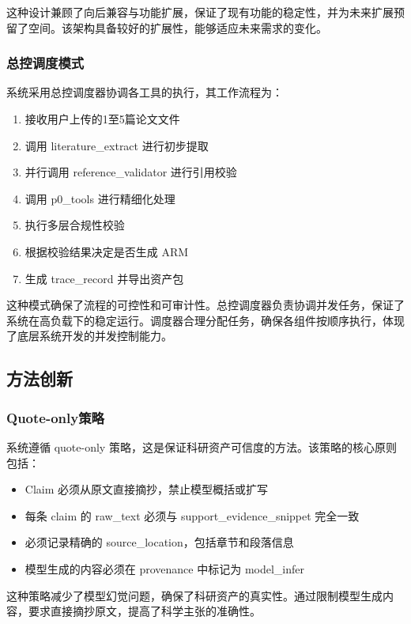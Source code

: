 ﻿\documentclass[a4paper,12pt]{article}
\begin{document}
这种设计兼顾了向后兼容与功能扩展，保证了现有功能的稳定性，并为未来扩展预留了空间。该架构具备较好的扩展性，能够适应未来需求的变化。

\subsubsection{总控调度模式}

系统采用总控调度器协调各工具的执行，其工作流程为：

\begin{enumerate}
    \item 接收用户上传的1至5篇论文文件
    \item 调用 literature\_extract 进行初步提取
    \item 并行调用 reference\_validator 进行引用校验
    \item 调用 p0\_tools 进行精细化处理
    \item 执行多层合规性校验
    \item 根据校验结果决定是否生成 ARM
    \item 生成 trace\_record 并导出资产包
\end{enumerate}

这种模式确保了流程的可控性和可审计性。总控调度器负责协调并发任务，保证了系统在高负载下的稳定运行。调度器合理分配任务，确保各组件按顺序执行，体现了底层系统开发的并发控制能力。

\subsection{方法创新}

\subsubsection{Quote-only策略}

系统遵循 quote-only 策略，这是保证科研资产可信度的方法。该策略的核心原则包括：

\begin{itemize}
    \item Claim 必须从原文直接摘抄，禁止模型概括或扩写
    \item 每条 claim 的 raw\_text 必须与 support\_evidence\_snippet 完全一致
    \item 必须记录精确的 source\_location，包括章节和段落信息
    \item 模型生成的内容必须在 provenance 中标记为 model\_infer
\end{itemize}

这种策略减少了模型幻觉问题，确保了科研资产的真实性。通过限制模型生成内容，要求直接摘抄原文，提高了科学主张的准确性。
\end{document}

